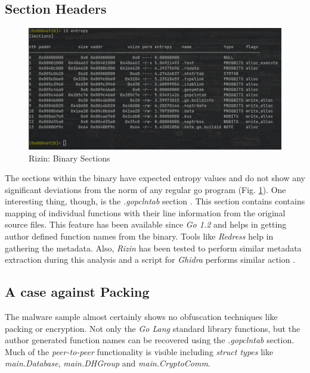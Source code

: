 \documentclass[10pt,a4paper]{article}
\begin{document}
	\subsection{Section Headers}
	\begin{figure}[!htbp]%
		\centering
		\includegraphics[width=\columnwidth]{pics/sections.png}
		\caption{Rizin: Binary Sections}
		\label{sections}
	\end{figure}
	The sections within the binary have expected entropy values and do not show any significant deviations from the norm of any regular go program (Fig. \ref{sections}).
	One interesting thing, though, is the \textit{.gopclntab} section \cite{pclntab} \cite{cujo}.
	This section contains contains mapping of individual functions with their line information from the original source files.
	This feature has been available since \textit{Go 1.2} and helps in getting author defined function names from the binary.
	Tools like \textit{Redress} \cite{redress} help in gathering the metadata.
	Also, \textit{Rizin} has been tested to perform similar metadata extraction during this analysis and a script for \textit{Ghidra} performs similar action \cite{gofunc}.

	\subsection{A case against Packing}
	The malware sample almost certainly shows no obfuscation techniques like packing or encryption.
	Not only the \textit{Go Lang} standard library functions, but the author generated function names can be recovered using the \textit{.gopclntab} section.
	Much of the \textit{peer-to-peer} functionality is visible including \textit{struct types} like \textit{main.Database}, \textit{main.DHGroup} and \textit{main.CryptoComm}.
\end{document}
